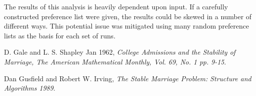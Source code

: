\documentclass[a4paper]{article}
\begin{document}
The results of this analysis is heavily dependent upon input.  
If a carefully constructed preference list were given, the results could be skewed in a number of different ways.
This potential issue was mitigated using many random preference lists as the basis for each set of runs.

\begin{thebibliography}{9}
  D. Gale and L. S. Shapley Jan 1962,
  \emph{College Admissions and the Stability of Marriage, The American Mathematical Monthly, Vol. 69, No. 1 pp. 9-15}.

  Dan Gusfield and Robert W. Irving,
  \emph{The Stable Marriage Problem: Structure and Algorithms 1989}.

\end{thebibliography}
\end{document}
